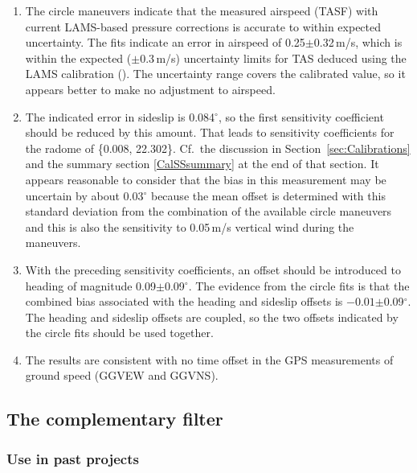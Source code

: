 \documentclass[12pt,twoside,english]{article}\usepackage[]{graphicx}\usepackage[]{color}
\begin{document}
\begin{enumerate}
\item The circle maneuvers indicate that the measured airspeed (TASF) with current LAMS-based pressure corrections is accurate to within expected uncertainty. The fits indicate an error in airspeed 
of 0.25$\pm$0.32\,m/s,%
which is within the expected ($\pm$0.3\,m/s) uncertainty limits for TAS deduced using the LAMS calibration (\citet{CooperEtAl2014}). The uncertainty range covers the calibrated value, so it appears better to make no adjustment to airspeed.  
\item The indicated error in sideslip is 0.084$^{\circ}$, so the first sensitivity coefficient should be reduced by this amount. That leads to sensitivity coefficients for the radome of  \{0.008, 22.302\}. Cf.\ the discussion in Section\ \ref{sec:Calibrations} and the summary section \ref{CalSSsummary} at the end of that section. It appears reasonable to consider that the bias in this measurement may be uncertain by about 0.03$^{\circ}$ because the mean offset is determined with this standard deviation from the combination of the available circle maneuvers and this is also the sensitivity to 0.05\,m/s vertical wind during the maneuvers. 
\item With the preceding sensitivity coefficients, an offset should be introduced to heading of magnitude 
0.09$\pm$0.09$^{\circ}$. 
The evidence from the circle fits is that the combined bias associated with the heading and sideslip offsets is \ensuremath{-0.01}$\pm$0.09$^{\circ}$. 
The heading and sideslip offsets are coupled, so the two offsets indicated by the circle fits should be used together.  
\item The results are consistent with no time offset in the GPS measurements of ground speed (GGVEW and GGVNS). 
\end{enumerate}

\vfill\eject



\subsection{The complementary filter\label{sub:comp-filter}}

\subsubsection{Use in past projects}
\end{document}
